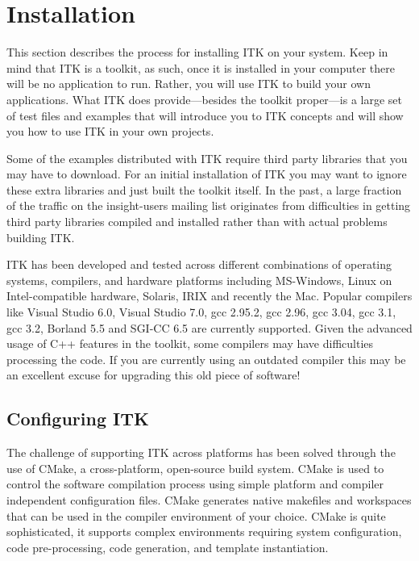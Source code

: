 \chapter{Installation}
\label{chapter:Installation}


This section describes the process for installing ITK on your system. Keep in
mind that ITK is a toolkit, as such, once it is installed in your computer
there will be no application to run. Rather, you will use ITK to build your
own applications. What ITK does provide---besides the toolkit proper---is a
large set of test files and examples that will introduce you to ITK concepts
and will show you how to use ITK in your own projects.

Some of the examples distributed with ITK require third party libraries that
you may have to download. For an initial installation of ITK you may want to
ignore these extra libraries and just built the toolkit itself. In the past,
a large fraction of the traffic on the insight-users mailing list originates from
difficulties in getting third party libraries compiled and installed rather
than with actual problems building ITK.

ITK has been developed and tested across different combinations of operating
systems, compilers, and hardware platforms including MS-Windows, Linux on
Intel-compatible hardware, Solaris, IRIX and recently the Mac. Popular
compilers like Visual Studio 6.0, Visual Studio 7.0, gcc 2.95.2, gcc 2.96,
gcc 3.04, gcc 3.1, gcc 3.2, Borland 5.5 and SGI-CC 6.5 are currently
supported. Given the advanced usage of C++ features in the toolkit, some
compilers may have difficulties processing the code. If you are currently
using an outdated compiler this may be an excellent excuse for upgrading this
old piece of software!

\section{Configuring ITK}
\label{sec:ConfiguringITK}

 
The challenge of supporting ITK across platforms has been solved through the
use of CMake, a cross-platform, open-source build system. CMake is used to
control the software compilation process using simple platform and compiler
independent configuration files.  CMake generates native makefiles and
workspaces that can be used in the compiler environment of your choice. CMake
is quite sophisticated, it supports complex environments requiring system
configuration, code pre-processing, code generation, and template
instantiation.

